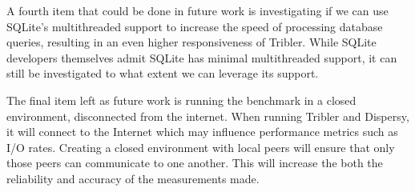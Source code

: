 A fourth item that could be done in future work is investigating if we can use SQLite's multithreaded support to increase the speed of processing database queries, resulting in an even higher responsiveness of Tribler.
While SQLite developers themselves admit SQLite has minimal multithreaded support, it can still be investigated to what extent we can leverage its support.

The final item left as future work is running the benchmark in a closed environment, disconnected from the internet.
When running Tribler and Dispersy, it will connect to the Internet which may influence performance metrics such as I/O rates.
Creating a closed environment with local peers will ensure that only those peers can communicate to one another.
This will increase the both the reliability and accuracy of the measurements made.
